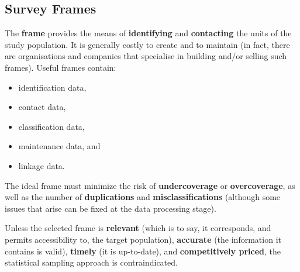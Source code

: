 \subsection{Survey Frames} The \textbf{frame} provides the means of \textbf{identifying} and \textbf{contacting} the units of the study population. It is generally costly to create and to maintain (in fact, there are organisations and companies that specialise in building and/or selling such frames). Useful frames contain: 
\begin{itemize}[noitemsep]
\item identification data, 
\item contact data, 
\item classification data,
\item maintenance data, and 
\item linkage data.
\end{itemize} The ideal frame must minimize the risk of \textbf{undercoverage} or \textbf{overcoverage}, as well as the number of \textbf{duplications} and \textbf{misclassifications} (although some issues that arise can be fixed at the data processing stage).\par Unless the selected frame is \textbf{relevant} (which is to say, it corresponds, and permits accessibility to, the target population), \textbf{accurate} (the information it contains is valid), \textbf{timely} (it is up-to-date), and \textbf{competitively priced}, the statistical sampling approach is contraindicated. 
